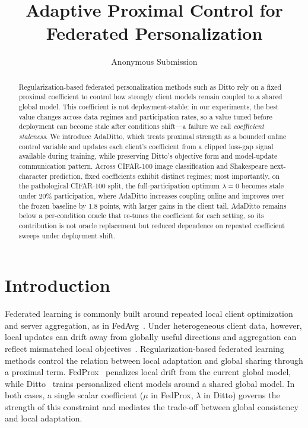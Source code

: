 \documentclass[letterpaper]{article} %
\title{Adaptive Proximal Control for Federated Personalization}
\author{
    Anonymous Submission
}
\begin{document}
\maketitle

\begin{abstract}
Regularization-based federated personalization methods such as Ditto rely on a fixed proximal coefficient to control how strongly client models remain coupled to a shared global model. This coefficient is not deployment-stable: in our experiments, the best value changes across data regimes and participation rates, so a value tuned before deployment can become stale after conditions shift---a failure we call \emph{coefficient staleness}. We introduce AdaDitto, which treats proximal strength as a bounded online control variable and updates each client's coefficient from a clipped loss-gap signal available during training, while preserving Ditto's objective form and model-update communication pattern. Across CIFAR-100 image classification and Shakespeare next-character prediction, fixed coefficients exhibit distinct regimes; most importantly, on the pathological CIFAR-100 split, the full-participation optimum $\lambda=0$ becomes stale under 20\% participation, where AdaDitto increases coupling online and improves over the frozen baseline by 1.8 points, with larger gains in the client tail. AdaDitto remains below a per-condition oracle that re-tunes the coefficient for each setting, so its contribution is not oracle replacement but reduced dependence on repeated coefficient sweeps under deployment shift.
\end{abstract}

\begin{links}
\end{links}

\section{Introduction}

Federated learning is commonly built around repeated local client
optimization and server aggregation, as in
FedAvg~\cite{mcmahan2017communication}. Under heterogeneous client
data, however, local updates can drift away from globally useful
directions and aggregation can reflect mismatched local
objectives~\cite{karimireddy2020scaffold,wang2020fednova}.
Regularization-based federated learning methods control the relation
between local adaptation and global sharing through a proximal term.
FedProx~\cite{li2020federated} penalizes local drift from the current
global model, while Ditto~\cite{li2021ditto} trains personalized
client models around a shared global model. In both cases, a single
scalar coefficient ($\mu$ in FedProx, $\lambda$ in Ditto) governs the
strength of this constraint and mediates the trade-off between global
consistency and local adaptation.
\end{document}
